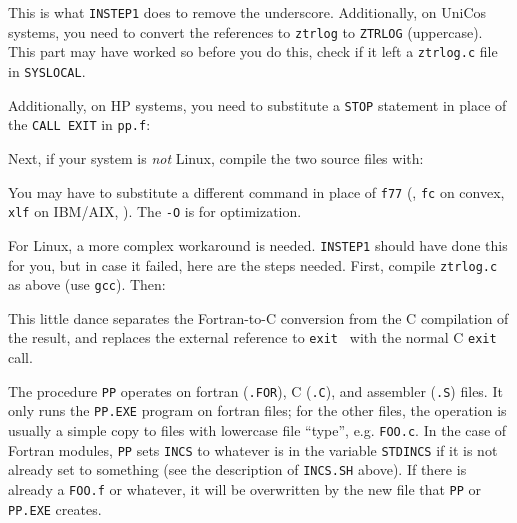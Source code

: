 \medskip

\noindent This is what {\tt INSTEP1} does to remove the underscore.
Additionally, on UniCos systems, you need to convert the references to
{\tt ztrlog} to {\tt ZTRLOG} (uppercase).  This part may have worked so
before you do this, check if it left a {\tt ztrlog.c} file in
{\tt\dol SYSLOCAL}.

Additionally, on HP systems, you need to substitute a {\tt STOP}
statement in place of the {\tt CALL EXIT} in {\tt pp.f}:\medskip


Next, if your system is {\it not\/} Linux, compile the two source files
with:\medskip

\medskip

\noindent You may have to substitute a different command in place of
{\tt f77} (\eg, {\tt fc} on convex, {\tt xlf} on IBM/AIX, \etc).  The
{\tt -O} is for optimization.

For Linux, a more complex workaround is needed.  {\tt INSTEP1} should
have done this for you, but in case it failed, here are the steps
needed.  First, compile {\tt ztrlog.c} as above (use {\tt gcc}).  Then:
\medskip

\medskip

\noindent This little dance separates the Fortran-to-C conversion from
the C compilation of the result, and replaces the external reference to
{\tt exit } with the normal C {\tt exit} call.

The procedure {\tt PP} operates on fortran ({\tt .FOR}), C ({\tt .C}),
and assembler ({\tt .S}) files.  It only runs the {\tt PP.EXE} program
on fortran files; for the other files, the operation is usually a simple
copy to files with lowercase file ``type'', e.g. {\tt FOO.c}.  In the
case of Fortran modules, {\tt PP} sets {\tt\dol INCS} to whatever is in the
variable {\tt\dol STDINCS} if it is not already set to something (see the
description of {\tt INCS.SH} above).  If there is already a {\tt FOO.f}
or whatever, it will be overwritten by the new file that {\tt PP} or
{\tt PP.EXE} creates.

